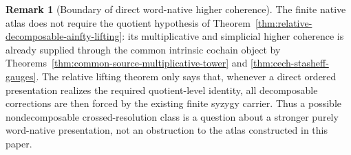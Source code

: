 \documentclass[11pt]{article}
\theoremstyle{definition}
\newtheorem{remark}[theorem]{Remark}
\begin{document}
\begin{remark}[Boundary of direct word-native higher coherence]\label{rem:direct-word-higher-coherence-boundary}
The finite native atlas does not require the quotient hypothesis of
Theorem~\ref{thm:relative-decomposable-ainfty-lifting}: its multiplicative and
simplicial higher coherence is already supplied through the common intrinsic
cochain object by Theorems~\ref{thm:common-source-multiplicative-tower} and
\ref{thm:cech-stasheff-gauges}.  The relative lifting theorem only says that,
whenever a direct ordered presentation realizes the required quotient-level
identity, all decomposable corrections are then forced by the existing finite
syzygy carrier.  Thus a possible nondecomposable crossed-resolution class is a
question about a stronger purely word-native presentation, not an obstruction to
the atlas constructed in this paper.
\end{remark}
\end{document}
